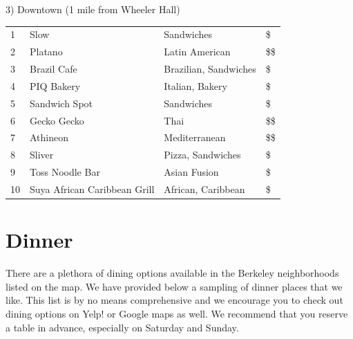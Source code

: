 3) Downtown (1 mile from Wheeler Hall)

\begingroup
\small
\begin{multicols}{1}[]
    \begin{tabular}{p{0.3cm} p{4cm} p{5cm} p{0.5cm}}
        1 & Slow & Sandwiches & \$\\
        2 & Platano & Latin American & \$\$\\
        3 & Brazil Cafe & Brazilian, Sandwiches & \$\\
        4 & PIQ Bakery & Italian, Bakery  & \$\\
        5 & Sandwich Spot & Sandwiches & \$\\ 
        6 & Gecko Gecko & Thai & \$\$\\
        7 & Athineon & Mediterranean & \$\$\\
        8 & Sliver & Pizza, Sandwiches & \$\\
        9 & Toss Noodle Bar & Asian Fusion & \$\\
        10 & Suya African Caribbean Grill & African, Caribbean & \$\\
    \end{tabular}
\end{multicols}
\endgroup
\normalsize 

 \section{Dinner}

There are a plethora of dining options available in the Berkeley neighborhoods listed on the map. We have provided below a sampling of dinner places that we like. This list is by no means comprehensive and we encourage you to check out dining options on Yelp! or Google maps as well. We recommend that you reserve a table in advance, especially on Saturday and Sunday.

